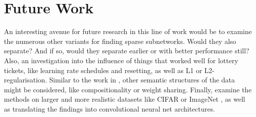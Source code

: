 \section{Future Work}
An interesting avenue for future research in this line of work would be to examine the numerous other variants for finding sparse subnetworks.
Would they also separate? And if so, would they separate earlier or with better performance still?
Also, an investigation into the influence of things that worked well for lottery tickets, like learning rate schedules and resetting, as well as L1 or L2-regularisation.
Similar to the work in \autocite{BIMT}, other semantic structures of the data might be considered, like compositionality or weight sharing.
Finally, examine the methods on larger and more realistic datasets like CIFAR \autocite{cifar} or ImageNet \autocite{imagenet}, as well as translating the findings into convolutional neural net architectures.